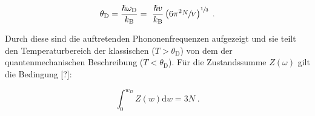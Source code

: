 \begin{equation}
    \label{eqn:Debye}
    \theta_\text{D} = \frac{\hbar\omega_\text{D}}{k_\text{B}} = \
    \frac{\hbar v}{k_\text{B}} \left(6\pi^2\sfrac{N}{V}\right)^{\sfrac{1}{3}} \; .
\end{equation}

Durch diese sind die auftretenden Phononenfrequenzen aufgezeigt und sie teilt den Temperaturbereich der klassischen ($T > \theta_\text{D}$)
von dem der quantenmechanischen Beschreibung ($T < \theta_\text{D}$).
Für die Zustandssumme $Z(\omega)$ gilt die Bedingung [?]:

\begin{equation}
    \label{eqn:Natome}
    \int_0^{w_D} Z\left(w\right)\text{d}w = 3N \; .
\end{equation}
